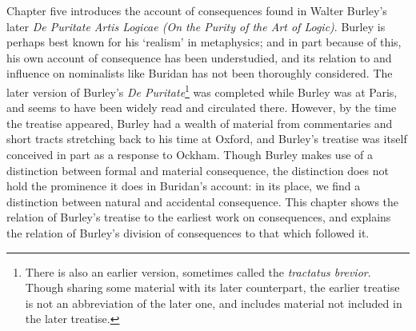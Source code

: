 			Chapter five introduces the account of consequences found in Walter Burley's later \textit{De Puritate Artis Logicae (On the Purity of the Art of Logic)}. Burley is perhaps best known for his `realism' in metaphysics; and in part because of this, his own account of consequence has been understudied, and its relation to and influence on nominalists like Buridan has not been thoroughly considered. The later version of Burley's \textit{De Puritate}\footnote{There is also an earlier version, sometimes called the \textit{tractatus brevior}. Though sharing some material with its later counterpart, the earlier treatise is not an abbreviation of the later one, and includes material not included in the later treatise.} was completed while Burley was at Paris, and seems to have been widely read and circulated there. However, by the time the treatise appeared, Burley had a wealth of material from commentaries and short tracts stretching back to his time at Oxford, and Burley's treatise was itself conceived in part as a response to Ockham. Though Burley makes use of a distinction between formal and material consequence, the distinction does not hold the prominence it does in Buridan's account: in its place, we find a distinction between natural and accidental consequence. This chapter shows the relation of Burley's treatise to the earliest work on consequences, and explains the relation of Burley's division of consequences to that which followed it.
			
			
			
